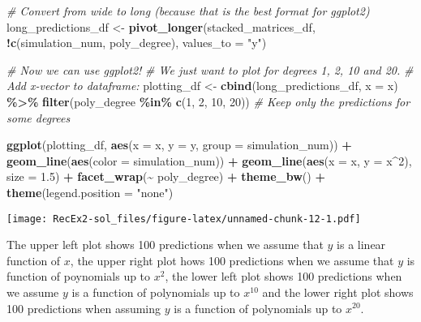 \documentclass[
]{article}
\newenvironment{Shaded}{\begin{snugshade}}{\end{snugshade}}
\newcommand{\AttributeTok}[1]{\textcolor[rgb]{0.13,0.29,0.53}{#1}}
\newcommand{\CommentTok}[1]{\textcolor[rgb]{0.56,0.35,0.01}{\textit{#1}}}
\newcommand{\DecValTok}[1]{\textcolor[rgb]{0.00,0.00,0.81}{#1}}
\newcommand{\FloatTok}[1]{\textcolor[rgb]{0.00,0.00,0.81}{#1}}
\newcommand{\FunctionTok}[1]{\textcolor[rgb]{0.13,0.29,0.53}{\textbf{#1}}}
\newcommand{\NormalTok}[1]{#1}
\newcommand{\OtherTok}[1]{\textcolor[rgb]{0.56,0.35,0.01}{#1}}
\newcommand{\SpecialCharTok}[1]{\textcolor[rgb]{0.81,0.36,0.00}{\textbf{#1}}}
\newcommand{\StringTok}[1]{\textcolor[rgb]{0.31,0.60,0.02}{#1}}
\begin{document}
\begin{Shaded}
\begin{Highlighting}[]
\CommentTok{\# Convert from wide to long (because that is the best format for ggplot2)}
\NormalTok{long\_predictions\_df }\OtherTok{\textless{}{-}} \FunctionTok{pivot\_longer}\NormalTok{(stacked\_matrices\_df, }
                                    \SpecialCharTok{!}\FunctionTok{c}\NormalTok{(simulation\_num, poly\_degree), }
                                    \AttributeTok{values\_to =} \StringTok{"y"}\NormalTok{)}

\CommentTok{\# Now we can use ggplot2!}
\CommentTok{\# We just want to plot for degrees 1, 2, 10 and 20.}
\CommentTok{\# Add x{-}vector to dataframe:}
\NormalTok{plotting\_df }\OtherTok{\textless{}{-}} \FunctionTok{cbind}\NormalTok{(long\_predictions\_df, }\AttributeTok{x =}\NormalTok{ x) }\SpecialCharTok{\%\textgreater{}\%} 
  \FunctionTok{filter}\NormalTok{(poly\_degree }\SpecialCharTok{\%in\%} \FunctionTok{c}\NormalTok{(}\DecValTok{1}\NormalTok{, }\DecValTok{2}\NormalTok{, }\DecValTok{10}\NormalTok{, }\DecValTok{20}\NormalTok{)) }\CommentTok{\# Keep only the predictions for some degrees}

\FunctionTok{ggplot}\NormalTok{(plotting\_df, }\FunctionTok{aes}\NormalTok{(}\AttributeTok{x =}\NormalTok{ x, }\AttributeTok{y =}\NormalTok{ y, }\AttributeTok{group =}\NormalTok{ simulation\_num)) }\SpecialCharTok{+}
  \FunctionTok{geom\_line}\NormalTok{(}\FunctionTok{aes}\NormalTok{(}\AttributeTok{color =}\NormalTok{ simulation\_num)) }\SpecialCharTok{+}
  \FunctionTok{geom\_line}\NormalTok{(}\FunctionTok{aes}\NormalTok{(}\AttributeTok{x =}\NormalTok{ x, }\AttributeTok{y =}\NormalTok{ x}\SpecialCharTok{\^{}}\DecValTok{2}\NormalTok{), }\AttributeTok{size =} \FloatTok{1.5}\NormalTok{) }\SpecialCharTok{+}
  \FunctionTok{facet\_wrap}\NormalTok{(}\SpecialCharTok{\textasciitilde{}}\NormalTok{ poly\_degree) }\SpecialCharTok{+}
  \FunctionTok{theme\_bw}\NormalTok{() }\SpecialCharTok{+}
  \FunctionTok{theme}\NormalTok{(}\AttributeTok{legend.position =} \StringTok{"none"}\NormalTok{)}
\end{Highlighting}
\end{Shaded}

\texttt{[image: RecEx2-sol\_files/figure-latex/unnamed-chunk-12-1.pdf]}

The upper left plot shows 100 predictions when we assume that \(y\) is a
linear function of \(x\), the upper right plot hows 100 predictions when
we assume that \(y\) is function of poynomials up to \(x^2\), the lower
left plot shows 100 predictions when we assume \(y\) is a function of
polynomials up to \(x^{10}\) and the lower right plot shows 100
predictions when assuming \(y\) is a function of polynomials up to
\(x^{20}\).
\end{document}

